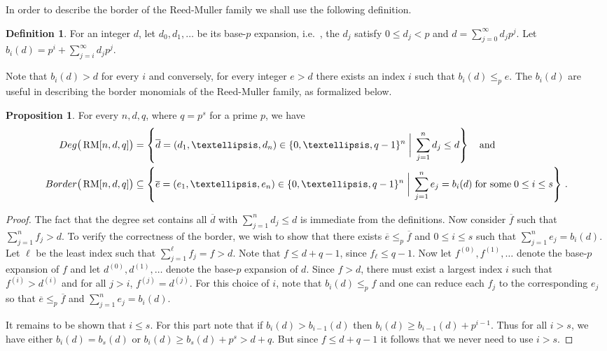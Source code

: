 \documentclass[10pt]{article}
\theoremstyle{definition}
\newtheorem{definition}[theorem]{Definition}
\providecommand{\ie}{i.e.\ }
\newtheorem{proposition}[theorem]{Proposition}
\numberwithin{equation}{section}
\newcommand{\set}[1]{\left\{{#1}\right\}}
\newcommand{\Border}{{\rm{Border}}}
\newcommand{\Deg}{{\rm{Deg}}}
\newcommand{\mrm}{\mathop{\mathrm{RM}}}
\begin{document}
In order to describe the border of the Reed-Muller family we shall use the following definition.
\begin{definition}\label{defn:bi}
For %
an
integer $d$, let $d_0,d_1,\ldots$ be its 
%
base-$p$ expansion, \ie, %
the $d_j$ satisfy   %
$0 \leq d_j < p$ and
$d = \sum_{j=0}^{\infty} d_j p^j$.
Let $b_i(d) = p^i + \sum_{j=i}^\infty d_j p^j$.
\end{definition}

Note that $b_i(d) > d$ for every $i$ and
conversely, for every integer $e > d$ there exists an index $i$ such
that $b_i(d) \leq_p e$.
%
The $b_i(d)$      %
are useful in describing
the border monomials of the Reed-Muller family, as formalized below.

\begin{proposition}
\label{prop:rmborder}
For every $n,d,q$, where $q=p^s$ for a prime $p$, we have
\begin{align*}
  \Deg\big(\mrm[n,d,q]\big) & =  \set{\overline d=(d_1,\ldots,d_n) \in \{0,\ldots,q-1\}^n \; \bigg| \; \sum_{j=1}^n d_j \leq d
} \quad\text{and}\\
\Border\big(\mrm[n,d,q]\big) & \subseteq 
\set{\overline e=(e_1,\ldots,e_n) \in \{0,\ldots,q-1\}^n \; \bigg| \;  \sum_{j=1}^n e_j = b_i(d) \; \text{for some} \; 0 \leq i \leq s   }\,.
\end{align*}
\end{proposition}

\begin{proof}
The fact that the degree set contains all ${\overline d}$
with $\sum_{j=1}^n d_j \leq d$ is immediate from the definitions.
Now consider ${\overline f}$ such that $\sum_{j=1}^n f_j > d$.
To verify the correctness of the border,
we wish to show that there exists ${\overline e} \leq_p
{\overline f}$ and $0 \leq i \leq s$ such that $\sum_{j=1}^n e_j =
b_i(d)$. Let $\ell$ be the least index such that $\sum_{j=1}^\ell
f_j = f > d$. Note that $f \leq d + q - 1$, since $f_\ell \leq
q - 1$. Now let $f^{(0)},f^{(1)},\ldots$ denote the
base-$p$ expansion of $f$ and let
$d^{(0)},d^{(1)},\ldots$ denote the base-$p$ expansion of $d$.
Since $f > d$, there must exist a largest index $i$ such that
$f^{(i)} > d^{(i)}$ and for all $j > i$, $f^{(j)} = d^{(j)}$.
For this choice of $i$, note that $b_i(d) \leq _p f$
and
one can reduce %
each $f_j$ to the corresponding $e_j$ %
so that
$\overline e \leq_p \overline f$ and $\sum_{j=1}^n e_j = b_i(d)$.

It remains to be shown that $i \leq s$. For this part
note that if $b_i(d) > b_{i-1}(d)$ then $b_i(d) \geq b_{i-1}(d) + p^{i-1}$.
Thus for all $i > s$, we have either $b_i(d) = b_s(d)$
or $b_i(d) \geq b_s(d) + p^s > d + q$. But since $f \leq d + q-1$
it follows that we never need to use $i > s$.
\end{proof}
\end{document}
